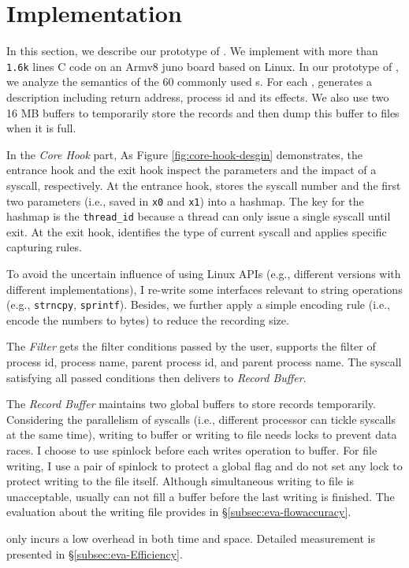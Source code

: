 \section{Implementation}

In this section, we describe our prototype of \TheName. We implement \TheName
with more than \texttt{1.6k} lines C code
on an Armv8 juno board based on Linux. In our prototype of \TheName, we analyze the semantics of the 60 commonly used
\syscall{}s. For each \syscall{}, \TheName generates a description including  return address, process id and its effects. We also use two 16 MB buffers to temporarily store
the \syscall{} records and then dump this buffer to files when it is full. 

In the \textit{Core Hook} part, As Figure \ref{fig:core-hook-desgin} demonstrates, the entrance hook and the exit hook inspect the parameters and the impact of a syscall, respectively. At the entrance hook, \TheName stores the syscall number and the first two parameters (i.e., saved in \texttt{x0} and \texttt{x1}) into a hashmap. The key for the hashmap is the \texttt{thread\_id} because a thread can only issue a single syscall until exit. At the exit hook, \TheName identifies the type of current syscall and applies specific capturing rules.

To avoid the uncertain influence of using Linux APIs (e.g., different versions with different implementations), I re-write some interfaces relevant to string operations (e.g., \texttt{strncpy}, \texttt{sprintf}). Besides, we further apply a simple encoding rule (i.e., encode the numbers to bytes) to reduce the recording size. 

The \textit{Filter} gets the filter conditions passed by the user, \TheName supports
the filter of process id, process name, parent process id, and parent process name. The syscall satisfying all passed conditions then delivers to \textit{Record Buffer}.

The \textit{Record Buffer} maintains two global buffers to store records temporarily. Considering the parallelism of syscalls (i.e., different processor can tickle syscalls at the same time), writing to buffer or writing to file needs locks to prevent data races. I choose to use spinlock before each writes operation to buffer. For file writing, I use a pair of spinlock to protect a global flag and do not set any lock to protect writing to the file itself. Although simultaneous writing to file is unacceptable, \TheName usually can not fill a buffer before the last writing is finished. The evaluation about the writing file provides in \S\ref{subsec:eva-flowaccuracy}.


\TheName only incurs a low overhead in both time and space. Detailed measurement is presented
in \S \ref{subsec:eva-Efficiency}.

